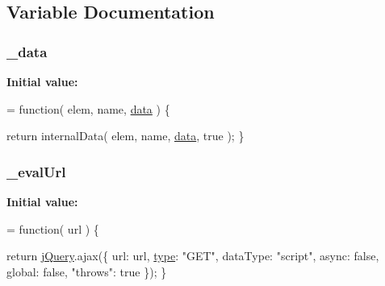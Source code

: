\subsection{Variable Documentation}
\hypertarget{jquery-1_810_82-vsdoc_8js_a01a70510ea17cfcb22c0ca5e079baf8c}{}
\subsubsection[{\+\_\+data}]{ \+\_\+data}\label{jquery-1_810_82-vsdoc_8js_a01a70510ea17cfcb22c0ca5e079baf8c}
{\bfseries Initial value\+:}
\begin{DoxyCode}
= \textcolor{keyword}{function}( elem, name, \hyperlink{jquery-1_810_82-vsdoc_8js_a609407b3456fdc3c5671a9fc4a226ff7}{data} ) \{

        \textcolor{keywordflow}{return} internalData( elem, name, \hyperlink{jquery-1_810_82-vsdoc_8js_a609407b3456fdc3c5671a9fc4a226ff7}{data}, \textcolor{keyword}{true} );
    \}
\end{DoxyCode}
\hypertarget{jquery-1_810_82-vsdoc_8js_a3df854ea600b5f5f02a872ad0feccfc2}{}
\subsubsection[{\+\_\+eval\+Url}]{ \+\_\+eval\+Url}\label{jquery-1_810_82-vsdoc_8js_a3df854ea600b5f5f02a872ad0feccfc2}
{\bfseries Initial value\+:}
\begin{DoxyCode}
= \textcolor{keyword}{function}( url ) \{

        \textcolor{keywordflow}{return} \hyperlink{jquery-1_810_82-vsdoc_8js_add5237586d970a38a81f990e8eb28c6c}{jQuery}.ajax(\{
            url: url,
            \hyperlink{jquery-1_810_82-vsdoc_8js_a3940565e83a9bfd10d95ffd27536da91}{type}: \textcolor{stringliteral}{"GET"},
            dataType: \textcolor{stringliteral}{"script"},
            async: \textcolor{keyword}{false},
            global: \textcolor{keyword}{false},
            \textcolor{stringliteral}{"throws"}: \textcolor{keyword}{true}
        \});
    \}
\end{DoxyCode}
\hypertarget{jquery-1_810_82-vsdoc_8js_ac896bda626b829bf9f8560a239e8f20b}{}
